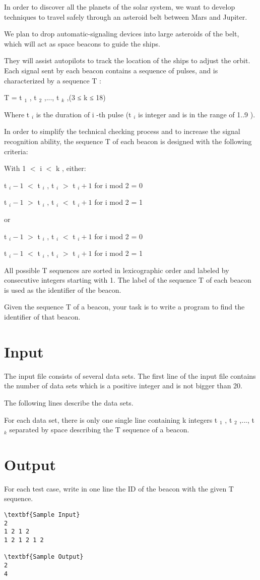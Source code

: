 

In order to discover all the planets of the solar system, we want to develop techniques to travel safely through an asteroid belt between Mars and Jupiter.

We plan to drop automatic-signaling devices into large asteroids of the belt, which will act as space beacons to guide the ships.

They will assist autopilots to track the location of the ships to adjust the orbit. Each signal sent by each beacon contains a sequence of pulses, and is characterized by a sequence T :

T = t $_ 1 $ , t $_ 2 $ ,..., t $_ k $ ,(3 ≤ k ≤ 18)

Where t $_ i $ is the duration of i -th pulse (t $_ i $ is integer and is in the range of 1..9 ).

In order to simplify the technical checking process and to increase the signal recognition ability, the sequence T of each beacon is designed with the following criteria:

With 1 $<$ i $<$ k , either:

t $_ i-1 $ $<$ t $_ i $ , t $_ i $ $>$ t $_ i+1 $ for i mod 2 = 0

t $_ i-1 $ $>$ t $_ i $ , t $_ i $ $<$ t $_ i+1 $ for i mod 2 = 1

or

t $_ i-1 $ $>$ t $_ i $ , t $_ i $ $<$ t $_ i+1 $ for i mod 2 = 0

t $_ i-1 $ $<$ t $_ i $ , t $_ i $ $>$ t $_ i+1 $ for i mod 2 = 1

All possible T sequences are sorted in lexicographic order and labeled by consecutive integers starting with 1. The label of the sequence T of each beacon is used as the identifier of the beacon.

Given the sequence T of a beacon, your task is to write a program to find the identifier of that beacon.

\section{Input}

The input file consists of several data sets. The first line of the input file contains the number of data sets which is a positive integer and is not bigger than 20.

The following lines describe the data sets.

For each data set, there is only one single line containing k integers t $_ 1 $ , t $_ 2 $ ,..., t $_ k $ separated by space describing the T sequence of a beacon.

\section{Output}

For each test case, write in one line the ID of the beacon with the given T sequence.
\begin{verbatim}
\textbf{Sample Input}
2
1 2 1 2
1 2 1 2 1 2

\textbf{Sample Output}
2
4\end{verbatim}